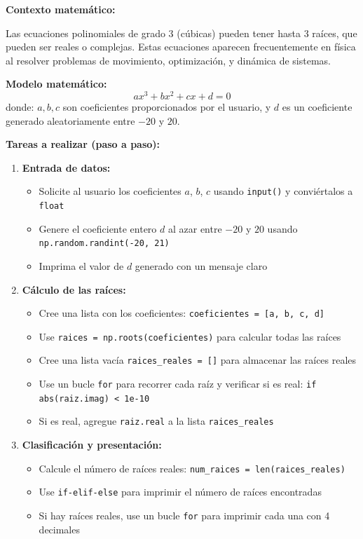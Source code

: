 \documentclass[10pt]{article}
\begin{document}
\begin{tcolorbox}[title={Pregunta 1 – Ecuación Cúbica}]

\noindent\textbf{Contexto matemático:}

Las ecuaciones polinomiales de grado 3 (cúbicas) pueden tener hasta 3 raíces, que pueden ser reales o complejas. Estas ecuaciones aparecen frecuentemente en física al resolver problemas de movimiento, optimización, y dinámica de sistemas.

\noindent\textbf{Modelo matemático:}
\[
ax^{3}+bx^{2}+cx+d=0
\]
donde: $a, b, c$ son coeficientes proporcionados por el usuario, y $d$ es un coeficiente generado aleatoriamente entre $-20$ y $20$.

\noindent\textbf{Tareas a realizar (paso a paso):}

\begin{enumerate}
  \item \textbf{Entrada de datos:}
  \begin{itemize}
    \item Solicite al usuario los coeficientes $a$, $b$, $c$ usando \texttt{input()} y conviértalos a \texttt{float}
    \item Genere el coeficiente entero $d$ al azar entre $-20$ y $20$ usando \texttt{np.random.randint(-20, 21)}
    \item Imprima el valor de $d$ generado con un mensaje claro
  \end{itemize}
  
  \item \textbf{Cálculo de las raíces:}
  \begin{itemize}
    \item Cree una lista con los coeficientes: \texttt{coeficientes = [a, b, c, d]}
    \item Use \texttt{raices = np.roots(coeficientes)} para calcular todas las raíces
    \item Cree una lista vacía \texttt{raices\_reales = []} para almacenar las raíces reales
    \item Use un bucle \texttt{for} para recorrer cada raíz y verificar si es real: \texttt{if abs(raiz.imag) < 1e-10}
    \item Si es real, agregue \texttt{raiz.real} a la lista \texttt{raices\_reales}
  \end{itemize}
  
  \item \textbf{Clasificación y presentación:}
  \begin{itemize}
    \item Calcule el número de raíces reales: \texttt{num\_raices = len(raices\_reales)}
    \item Use \texttt{if-elif-else} para imprimir el número de raíces encontradas
    \item Si hay raíces reales, use un bucle \texttt{for} para imprimir cada una con 4 decimales
  \end{itemize}
\end{enumerate}

\end{tcolorbox}
\end{document}
